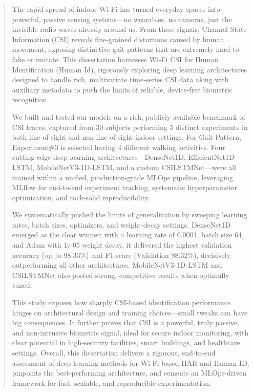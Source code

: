 \begin{abstract}
The rapid spread of indoor Wi‑Fi has turned everyday spaces into powerful, passive sensing systems—no wearables, no cameras, just the invisible radio waves already around us. From these signals, Channel State Information (CSI) reveals fine-grained distortions caused by human movement, exposing distinctive gait patterns that are extremely hard to fake or imitate. This dissertation harnesses Wi‑Fi CSI for Human Identification (Human Id), rigorously exploring deep learning architectures designed to handle rich, multivariate time‑series CSI data along with auxiliary metadata to push the limits of reliable, device‑free biometric recognition.

We built and tested our models on a rich, publicly available benchmark of CSI traces, captured from 30 subjects performing 5 distinct experiments in both line-of-sight and non-line-of-sight indoor settings. For Gait Pattern, Experiment\#3 is selected having 4 different walking activities. Four cutting-edge deep learning architectures—DenseNet1D, EfficientNet1D-LSTM, MobileNetV3-1D-LSTM, and a custom CSILSTMNet—were all trained within a unified, production-grade MLOps pipeline, leveraging MLflow for end-to-end experiment tracking, systematic hyperparameter optimization, and rock-solid reproducibility.

We systematically pushed the limits of generalization by sweeping learning rates, batch sizes, optimizers, and weight-decay settings. DenseNet1D emerged as the clear winner: with a learning rate of 0.0001, batch size 64, and Adam with 1e-05 weight decay, it delivered the highest validation accuracy (up to 98.33\%) and F1-score (Validation 98.32\%), decisively outperforming all other architectures. MobileNetV3-1D-LSTM and CSILSTMNet also posted strong, competitive results when optimally tuned.

This study exposes how sharply CSI-based identification performance hinges on architectural design and training choices—small tweaks can have big consequences. It further proves that CSI is a powerful, truly passive, and non-intrusive biometric signal, ideal for secure indoor monitoring, with clear potential in high-security facilities, smart buildings, and healthcare settings. Overall, this dissertation delivers a rigorous, end-to-end assessment of deep learning methods for Wi-Fi-based HAR and Human-ID, pinpoints the best-performing architecture, and cements an MLOps-driven framework for fast, scalable, and reproducible experimentation.
\end{abstract}

 
